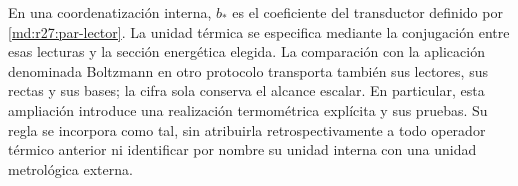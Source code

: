 En una coordenatización interna, $b_*$ es el coeficiente del transductor definido por
\eqref{md:r27:par-lector}. La unidad térmica se especifica mediante la
conjugación entre esas lecturas y la sección energética elegida. La comparación
con la aplicación denominada Boltzmann en otro protocolo transporta también
sus lectores, sus rectas y sus bases; la cifra sola conserva el alcance escalar.
En particular, esta ampliación introduce una realización termométrica
explícita y sus pruebas. Su regla se incorpora como tal, sin atribuirla
retrospectivamente a todo operador térmico anterior ni identificar por nombre
su unidad interna con una unidad metrológica externa.
